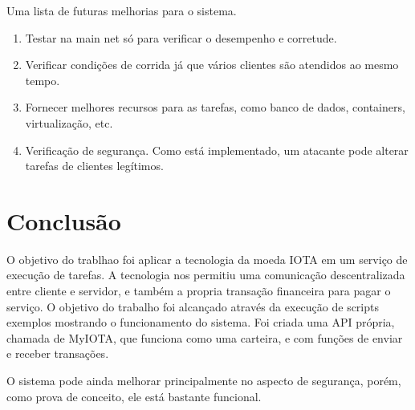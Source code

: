 \documentclass[a4paper]{article}
\begin{document}
Uma lista de futuras melhorias para o sistema.

\begin{enumerate}
\item Testar na main net só para verificar o desempenho e corretude.
\item Verificar condições de corrida já que vários clientes são atendidos ao mesmo tempo.
\item Fornecer melhores recursos para as tarefas, como banco de dados, containers, virtualização, etc.
\item Verificação de segurança. Como está implementado, um atacante pode alterar tarefas de clientes legítimos.
\end{enumerate}

\section{Conclusão}
O objetivo do trablhao foi aplicar a tecnologia da moeda IOTA em um serviço de execução de tarefas. A tecnologia nos permitiu uma
comunicação descentralizada entre cliente e servidor, e também a propria transação financeira para pagar o serviço. O objetivo do
trabalho foi alcançado através da execução de scripts exemplos mostrando o funcionamento do sistema. Foi criada uma API própria,
chamada de MyIOTA, que funciona como uma carteira, e com funções de enviar e receber transações.

O sistema pode ainda melhorar principalmente no aspecto de segurança, porém, como prova de conceito, ele está bastante funcional.

%
%
\end{document}
